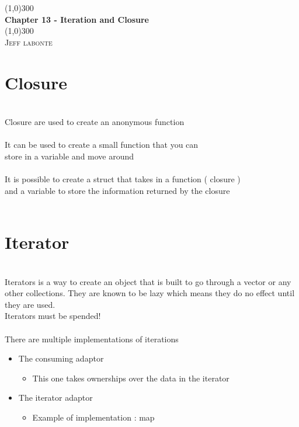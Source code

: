 \documentclass{article}
\begin{document}
  \begin{titlepage}
    \begin{center}
      \line(1,0){300} \\
      [0.25in]
      \huge{\bfseries Chapter 13 - Iteration and Closure}\\
      [2mm]
      \line(1,0){300}\\
      [1.5cm]
      \textsc{\LARGE Jeff labonte}\\
      [0.75cm]
    \end{center}
  \end{titlepage}
 \section {Closure}
 \ \\[2mm]
 Closure are used to create an anonymous function \\
 \ \\[2mm]
 It can be used to create a small function  that you can \\
 store in a variable and move around\\
 \ \\[2mm]
 It is possible to create a struct that takes in a function ( closure ) \\
 and a variable to store the information returned by the closure \\
 \ \\[2mm]
 \section{Iterator}
 \ \\[2mm]
 Iterators is a way to create an object that is built to go 
 through a vector or any other collections. They are known to be 
 lazy which means they do no effect until they are used.\\
 Iterators must be spended! \\
 \ \\[2mm]
 There are multiple implementations of iterations \\
 \begin{itemize}
     \item The consuming adaptor
         \begin{itemize}
             \item This one takes ownerships over the data in the iterator
         \end{itemize}
     \item The iterator adaptor
         \begin{itemize}
             \item Example of implementation : map
         \end{itemize}
 \end{itemize}
\end{document}

